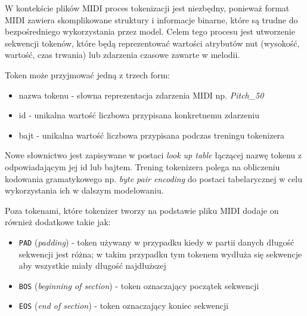 \documentclass[data-science]{agh-wi} %
\begin{document}
W kontekście plików MIDI proces tokenizacji jest niezbędny, ponieważ format MIDI zawiera skomplikowane struktury i informacje binarne, które są trudne do bezpośredniego wykorzystania przez model. Celem tego procesu jest utworzenie sekwencji tokenów, które będą reprezentować wartości atrybutów nut (wysokość, wartość, czas trwania) lub zdarzenia czasowe zawarte w melodii.

Token może przyjmować jedną z trzech form:
\begin{itemize}
    \item nazwa tokenu - słowna reprezentacja zdarzenia MIDI np. \textit{Pitch\_50}
    \item id - unikalna wartość liczbowa przypisana konkretnemu zdarzeniu
    \item bajt - unikalna wartość liczbowa przypisana podczas treningu tokenizera
\end{itemize}

Nowe słownictwo jest zapisywane w postaci \textit{look up table} łączącej nazwę tokenu z odpowiadającym jej id lub bajtem. Trening tokenizera polega na obliczeniu kodowania gramatykowego np. \textit{byte pair encoding} do postaci tabelarycznej w celu wykorzystania ich w dalszym modelowaniu.

Poza tokenami, które tokenizer tworzy na podstawie pliku MIDI dodaje on również dodatkowe takie jak:
\begin{itemize}
    \item \texttt{PAD} (\textit{padding}) - token używany w przypadku kiedy w partii danych długość sekwencji jest różna; w takim przypadku tym tokenem wydłuża się sekwencje aby wszystkie miały długość najdłuższej
    \item \texttt{BOS} (\textit{beginning of section}) - token oznaczający początek sekwencji
    \item \texttt{EOS} (\textit{end of section}) - token oznaczający koniec sekwencji
\end{itemize}
\end{document}
